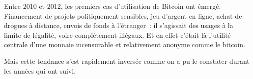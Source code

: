 Entre 2010 et 2012, les premiers cas d'utilisation de Bitcoin ont émergé. Financement de projets politiquement sensibles, jeu d'argent en ligne, achat de drogues à distance, envois de fonds à l'étranger~: il s'agissait des usages à la limite de légalité, voire complètement illégaux. Et en effet c'était là l'utilité centrale d'une monnaie incensurable et relativement anonyme comme le bitcoin.

Mais cette tendance s'est rapidement inversée comme on a pu le constater durant les années qui ont suivi.

\printendnotes
